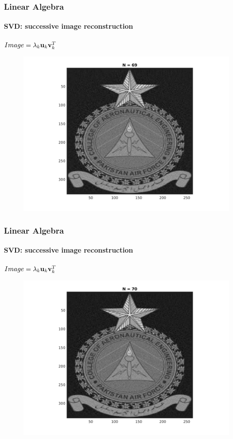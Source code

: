 \documentclass[hyperref={pdfpagelabels=true}]{beamer}
\begin{document}
\begin{frame}
\frametitle{Linear Algebra}
\framesubtitle{SVD: successive image reconstruction} 
\small{
\begin{center}
$Image = \lambda_k{\bf u}_k {\bf v}_k^T$
\end{center}}
\begin{figure}[!htb]
\centering
\includegraphics [scale=0.48]{n/b69.png}
\end{figure}
\end{frame}

\begin{frame}
\frametitle{Linear Algebra}
\framesubtitle{SVD: successive image reconstruction} 
\small{
\begin{center}
$Image = \lambda_k{\bf u}_k {\bf v}_k^T$
\end{center}}
\begin{figure}[!htb]
\centering
\includegraphics [scale=0.48]{n/b70.png}
\end{figure}
\end{frame}
\end{document}
